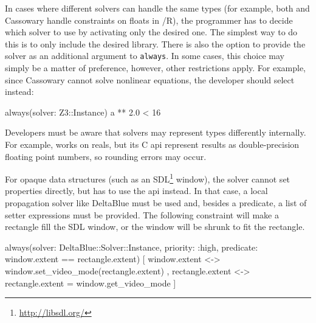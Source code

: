 In cases where different solvers can handle the same types (for
example, both \zthree and Cassowary handle constraints on floats in
\langname/R), the programmer has to decide which solver to use by
activating only the desired one. The simplest way to do this is to
only include the desired library. There is also the option to provide
the solver as an additional argument to \lstinline{always}. In some
cases, this choice may simply be a matter of preference, however,
other restrictions apply. For example, since Cassowary cannot solve
nonlinear equations, the developer should select \zthree instead:
\begin{code}[numbers=none]
always(solver: Z3::Instance) { a ** 2.0 < 16 }
\end{code}
Developers must be aware that solvers may represent types differently
internally. For example, \zthree works on reals, but its C \ac{api}
represent results as double-precision floating point numbers, so
rounding errors may occur.

For opaque data structures (such as an
\textsc{SDL}\footnote{\url{http://libsdl.org/}} window), the solver
cannot set properties directly, but has to use the \ac{api}
instead. In that case, a local propagation solver like DeltaBlue must
be used and, besides a predicate, a list of setter expressions must be
provided. The following constraint will make a rectangle fill the
\textsc{SDL} window, or the window will be shrunk to fit the
rectangle.
\begin{code}
always(solver: DeltaBlue::Solver::Instance,
       priority: :high,
       predicate: {window.extent == rectangle.extent}) {[
  window.extent <-> { window.set_video_mode(rectangle.extent) },
  rectangle.extent <-> { rectangle.extent = window.get_video_mode }
]}
\end{code}

